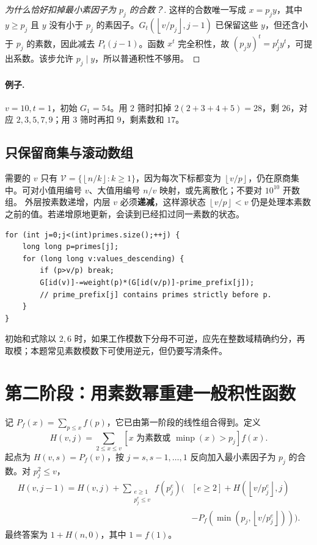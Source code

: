 \documentclass[UTF8,a4paper,11pt,oneside,openany,fontset=fandol]{ctexbook}
\theoremstyle{definition}
\newcommand{\floor}[1]{\left\lfloor #1\right\rfloor}
\begin{document}
\begin{proof}[为什么恰好扣掉最小素因子为 $p_j$ 的合数？]
这样的合数唯一写成 $x=p_jy$，其中 $y\ge p_j$ 且 $y$ 没有小于 $p_j$ 的素因子。$G_t(\floor{v/p_j},j-1)$ 已保留这些 $y$，但还含小于 $p_j$ 的素数，因此减去 $P_t(j-1)$。函数 $x^t$ 完全积性，故 $(p_jy)^t=p_j^ty^t$，可提出系数。该步允许 $p_j\mid y$，所以普通积性不够用。
\end{proof}
\paragraph{例子.} $v=10,t=1$，初始 $G_1=54$。用 $2$ 筛时扣掉 $2(2+3+4+5)=28$，剩 $26$，对应 $2,3,5,7,9$；用 $3$ 筛时再扣 $9$，剩素数和 $17$。

\subsection{只保留商集与滚动数组}
需要的 $v$ 只有 $\mathcal V=\{\floor{n/k}:k\ge1\}$，因为每次下标都变为 $\floor{v/p}$，仍在原商集中。可对小值用编号 $v$、大值用编号 $n/v$ 映射，或先离散化；不要对 $10^{10}$ 开数组。
外层按素数递增，内层 $v$ 必须\textbf{递减}，这样源状态 $\floor{v/p}<v$ 仍是处理本素数之前的值。若递增原地更新，会读到已经扣过同一素数的状态。
\begin{lstlisting}
for (int j=0;j<(int)primes.size();++j) {
    long long p=primes[j];
    for (long long v:values_descending) {
        if (p>v/p) break;
        G[id(v)]-=weight(p)*(G[id(v/p)]-prime_prefix[j]);
        // prime_prefix[j] contains primes strictly before p.
    }
}
\end{lstlisting}
初始和式除以 $2,6$ 时，如果工作模数下分母不可逆，应先在整数域精确约分，再取模；本题常见素数模数下可使用逆元，但仍要写清条件。


\section{第二阶段：用素数幂重建一般积性函数}
记 $P_f(x)=\sum_{p\le x}f(p)$，它已由第一阶段的线性组合得到。定义
\[
 H(v,j)=\sum_{2\le x\le v}
 [x\text{ 为素数或 }\operatorname{minp}(x)>p_j]f(x).
\]
起点为 $H(v,s)=P_f(v)$，按 $j=s,s-1,\ldots,1$ 反向加入最小素因子为 $p_j$ 的合数。对 $p_j^2\le v$，
\[
\begin{aligned}
 H(v,j-1)=H(v,j)+\sum_{\substack{e\ge1\\p_j^e\le v}} f(p_j^e)
 \biggl(&[e\ge2]+H(\floor{v/p_j^e},j)\\
 &-P_f(\min(p_j,\floor{v/p_j^e}))\biggr).
\end{aligned}
\]
最终答案为 $1+H(n,0)$，其中 $1=f(1)$。
\end{document}
